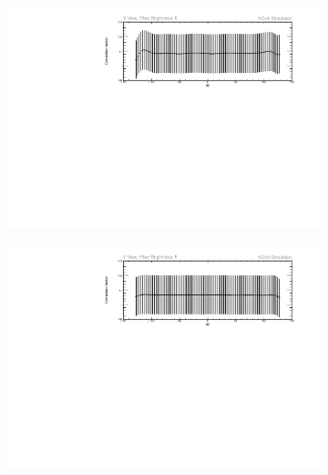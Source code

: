 \begin{figure}[hbtp]
\centering
\begin{subfigure}[t]{\textwidth}
\centering
\includegraphics[width=\textwidth]{Plots/TBCalibration/ThresholdCorrectionExample_axview_fb0_P4DataBasedSim.pdf}
\end{subfigure}
\begin{subfigure}[b]{\textwidth}
\centering
\includegraphics[width=\textwidth]{Plots/TBCalibration/ThresholdCorrectionExample_ayview_fb5_P4DataBasedSim.pdf}
\end{subfigure}
\begin{subfigure}[t]{\textwidth}
\centering

\end{subfigure}
\end{figure}
